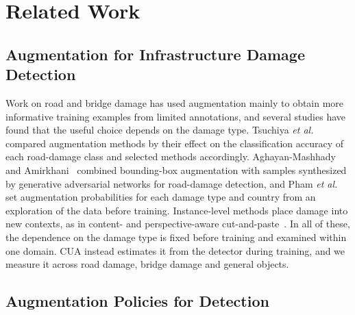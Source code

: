 
\section{Related Work}
\label{sec:related}

\subsection{Augmentation for Infrastructure Damage Detection}

Work on road and bridge damage has used augmentation mainly to obtain more informative training examples from limited annotations, and several studies have found that the useful choice depends on the damage type. Tsuchiya \emph{et al.}~\cite{tsuchiya2019} compared augmentation methods by their effect on the classification accuracy of each road-damage class and selected methods accordingly. Aghayan-Mashhady and Amirkhani~\cite{aghayan2024} combined bounding-box augmentation with samples synthesized by generative adversarial networks for road-damage detection, and Pham \emph{et al.}~\cite{rdd_detectron2} set augmentation probabilities for each damage type and country from an exploration of the data before training. Instance-level methods place damage into new contexts, as in content- and perspective-aware cut-and-paste~\cite{rdd_cutpaste}. In all of these, the dependence on the damage type is fixed before training and examined within one domain. CUA instead estimates it from the detector during training, and we measure it across road damage, bridge damage and general objects.

\subsection{Augmentation Policies for Detection}

